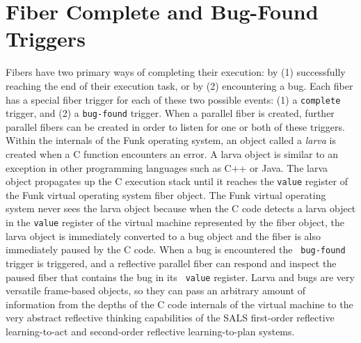 \section{Fiber Complete and Bug-Found Triggers}

Fibers have two primary ways of completing their execution: by (1)
successfully reaching the end of their execution task, or by (2)
encountering a bug.  Each fiber has a special fiber trigger for each
of these two possible events: (1) a {\tt complete} trigger, and (2) a
{\tt bug-found} trigger.  When a parallel fiber is created, further
parallel fibers can be created in order to listen for one or both of
these triggers.  Within the internals of the Funk operating system, an
object called a \emph{larva} is created when a C function encounters
an error.  A larva object is similar to an exception in other
programming languages such as C++ or Java.  The larva object
propagates up the C execution stack until it reaches the {\tt value}
register of the Funk virtual operating system fiber object.  The Funk
virtual operating system never sees the larva object because when the
C code detects a larva object in the {\tt value} register of the
virtual machine represented by the fiber object, the larva object is
immediately converted to a bug object and the fiber is also
immediately paused by the C code.  When a bug is encountered the {\tt
  bug-found} trigger is triggered, and a reflective parallel fiber can
respond and inspect the paused fiber that contains the bug in its {\tt
  value} register.  Larva and bugs are very versatile frame-based
objects, so they can pass an arbitrary amount of information from the
depths of the C code internals of the virtual machine to the very
abstract reflective thinking capabilities of the SALS first-order
reflective learning-to-act and second-order reflective
learning-to-plan systems.




